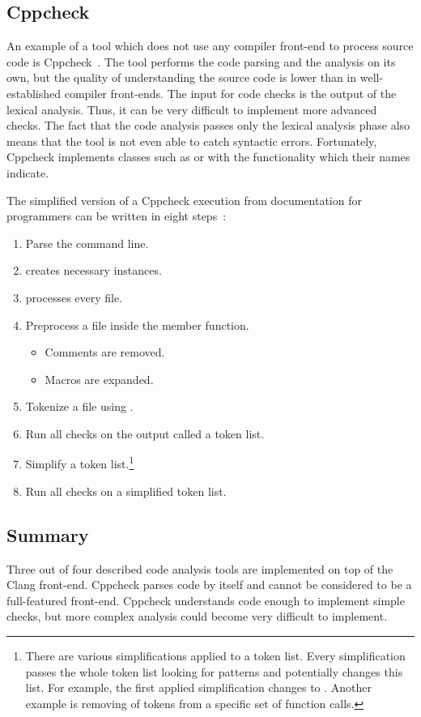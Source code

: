 \subsection{Cppcheck}
An example of a tool which does not use any compiler front-end to process source code is Cppcheck~\cite{cppcheck}. The tool performs the code parsing and the analysis on its own, but the quality of understanding the source code is lower than in well-established compiler front-ends. The input for code checks is the output of the lexical analysis. Thus, it can be very difficult to implement more advanced checks. The fact that the code analysis passes only the lexical analysis phase also means that the tool is not even able to catch syntactic errors. Fortunately, Cppcheck implements classes such as  or  with the functionality which their names indicate.

The simplified version of a Cppcheck execution from documentation for programmers can be written in eight steps~\cite{cppcheck-doxygen}:

\begin{enumerate}
\item Parse the command line.
\item {} creates necessary  instances.
\item {} processes every file.
\item Preprocess a file inside the  member function.
    \begin{itemize}
    \item Comments are removed.
    \item Macros are expanded.
    \end{itemize}
\item Tokenize a file using .
\item Run all checks on the  output called a token list.
\item Simplify a token list.\footnote{There are various simplifications applied to a token list. Every simplification passes the whole token list looking for patterns and potentially changes this list. For example, the first applied simplification changes  to . Another example is removing of  tokens from a specific set of function calls.}
\item Run all checks on a simplified token list.
\end{enumerate}

\subsection{Summary}
Three out of four described code analysis tools are implemented on top of the Clang front-end. Cppcheck parses code by itself and cannot be considered to be a full-featured front-end. Cppcheck understands code enough to implement simple checks, but more complex analysis could become very difficult to implement.

